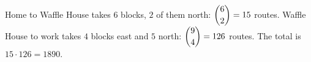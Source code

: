 Home to Waffle House takes $6$ blocks, $2$ of them north: $\dbinom62=15$ routes. Waffle House to work takes $4$ blocks east and $5$ north: $\dbinom94=126$ routes. The total is $15\cdot126=\boxed{1890}$.

